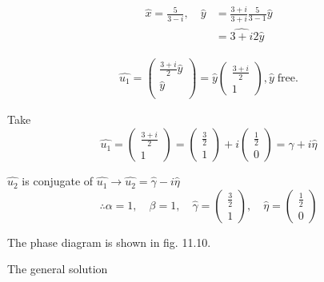\documentclass[12pt]{article}
\begin{document}
\begin{equation}
  \begin{aligned}
    \hat{x} = \frac{5}{3-i},\quad \hat{y}&=\frac{3+i}{3+i}\frac{5}{3-1}\hat{y} \\
    &=\hat{3+i}{2}\hat{y}
  \end{aligned}
\end{equation}

\begin{equation}
  \begin{aligned}
    \hat{u_1} =
    \begin{pmatrix}
      \frac{3+i}{2}\hat{y} \\
      \hat{y} \\
    \end{pmatrix} =
    \hat{y}
    \begin{pmatrix}
      \frac{3+i}{2} \\ 1
    \end{pmatrix}, \hat{y}\;\text{free}.
  \end{aligned}
\end{equation}

Take
\begin{equation}
  \hat{u_1} =
  \begin{pmatrix}
    \frac{3+i}{2} \\ 1
  \end{pmatrix} =
  \begin{pmatrix}
    \frac{3}{2} \\ 1
  \end{pmatrix} +
  i\begin{pmatrix}
    \frac{1}{2} \\ 0
  \end{pmatrix} =
  \hat{\gamma} + i\hat{\eta}
\end{equation}

$\hat{u_2}$ is conjugate of
$\hat{u_1}\rightarrow\hat{u_2}=\hat{\gamma}-i\hat{\eta}$
$$\therefore \alpha=1,\quad \beta=1,\quad \hat{\gamma}=
\begin{pmatrix}
  \frac{3}{2} \\ 1
\end{pmatrix},\quad \hat{\eta} =
\begin{pmatrix}
  \frac{1}{2} \\ 0
\end{pmatrix}
$$

The phase diagram is shown in fig. 11.10.

The general solution
\end{document}
